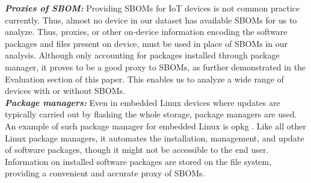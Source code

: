 \textbf{\textit{Proxies of SBOM:}} Providing SBOMs for IoT devices is not
common practice currently. Thus, almost no device in our dataset has available SBOMs for
us to analyze. Thus, proxies, or other on-device information encoding the
software packages and files present on device, must be used in place of SBOMs
in our analysis. Although only accounting for packages installed through
package manager, it proves to be a good proxy to SBOMs, as further demonstrated
in the Evaluation section of this paper. This enables us to analyze a wide
range of devices with or without SBOMs. \\
\textbf{\textit{Package managers:}} Even in embedded Linux devices where updates are typically carried out by
flashing the whole storage, package managers are used. An example of such
package manager for embedded Linux is opkg \cite{opkg}. Like all other Linux
package managers, it automates the installation, management, and update of
software packages, though it might not be accessible to the end user.
Information on installed software packages are stored on the file system,
providing a convenient and accurate proxy of SBOMs.


